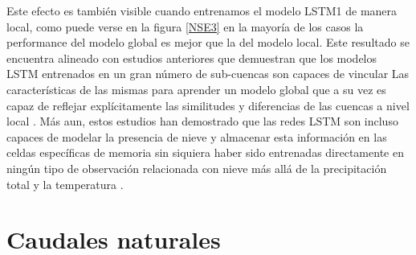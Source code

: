 
Este efecto es también visible cuando entrenamos el modelo LSTM1 de manera local,
como puede verse en la figura \ref{NSE3} en la mayoría de los casos la performance del modelo global  es 
mejor que la del modelo local. Este resultado se encuentra alineado con estudios anteriores 
que demuestran que los modelos LSTM entrenados en un gran número de sub-cuencas son capaces de vincular Las
características de las mismas para aprender un modelo global que a su vez es capaz de reflejar  
explícitamente las similitudes y diferencias de las cuencas a nivel local  \cite{Kratzert}. 
Más aun, estos estudios han demostrado que las redes LSTM son incluso capaces de modelar la presencia de nieve y 
almacenar esta información en las celdas específicas de memoria sin siquiera haber sido entrenadas directamente en 
ningún tipo de observación relacionada con nieve más allá de la precipitación total y la temperatura \cite{Kratzert2}.

\section{Caudales naturales}


